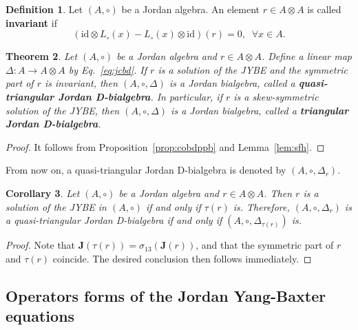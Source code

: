 \documentclass[12pt, reqno, a4paper]{amsart}
\newtheorem{theorem}{Theorem}[section]
\newtheorem{corollary}[theorem]{Corollary}
\theoremstyle{definition}
\newtheorem{definition}[theorem]{Definition}
\newcommand{\id}{\mathrm{id}}
\begin{document}
\begin{definition}
	Let $(A, \circ)$ be a Jordan algebra.
	An element $r \in A \otimes A$ is called \textbf{invariant} if
	\begin{equation*}
		( \id \otimes L_{\circ}(x) - L_{\circ}(x) \otimes \id )(r) = 0, \;\; \forall x \in A.
	\end{equation*}
\end{definition}


\begin{theorem}\label{CJBforQuasiandTri}
	Let $(A, \circ)$ be a Jordan algebra and $r \in A \otimes A$.
	Define a linear map $\Delta: A \to A \otimes A$ by Eq.~\eqref{eq:jcbd}.
	If $r$ is a solution of the JYBE and the symmetric part of $r$ is invariant,
	then $(A, \circ, \Delta)$ is a Jordan bialgebra, called a \textbf{quasi-triangular Jordan D-bialgebra}.
	In particular, if $r$ is a skew-symmetric solution of the JYBE, then $(A, \circ, \Delta)$ is a Jordan bialgebra, called a \textbf{triangular Jordan D-bialgebra}.
\end{theorem}
\begin{proof}
	It follows from Proposition~\ref{prop:cobdppb} and Lemma~\ref{lem:sfh}.
\end{proof}


From now on, a quasi-triangular Jordan D-bialgebra is denoted by $(A, \circ, \Delta_r)$.

\begin{corollary}\label{coro:trr}
	Let $(A, \circ)$ be a Jordan algebra and $r \in A \otimes A$.
	Then $r$ is a solution of the JYBE in $(A, \circ)$ if and only if $\tau(r)$ is. 
	Therefore, $(A, \circ, \Delta_r)$ is a quasi-triangular Jordan D-bialgebra if and only if $(A, \circ, \Delta_{\tau(r)})$ is.
\end{corollary}
\begin{proof} 
	Note that $\mathbf{J}( \tau(r)) = \sigma_{13}(\mathbf{J}(r))$, and that the symmetric part of $r$ and $\tau(r)$ coincide. 
	The desired conclusion then follows immediately.
\end{proof}




\subsection{Operators forms of the Jordan Yang-Baxter equations}
\end{document}
